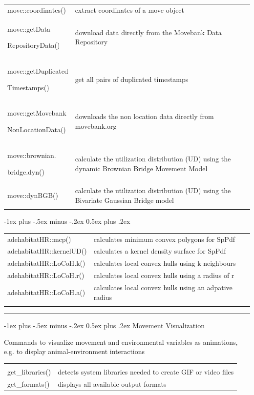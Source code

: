 \documentclass[a4paper,10pt,landscape]{article}
\makeatletter
\renewcommand{\section}{\@startsection{section}{1}{0mm}%
                                {-1ex plus -.5ex minus -.2ex}%
                                {0.5ex plus .2ex}%
                                {\normalfont\large\bfseries}}
\makeatother
\begin{document}
\begin{multicols}{3}
\begin{tabular}{@{}p{\the\MyLen}%
                @{}p{\linewidth-\the\MyLen}@{}}
move::coordinates() & extract coordinates of a move object\\
move::getData\par
RepositoryData() & download data directly from the Movebank Data Repository\\
move::getDuplicated\par
Timestamps() & get all pairs of duplicated timestamps\\
move::getMovebank\par
NonLocationData() & downloads the non location data directly from movebank.org\\
move::brownian.\par
bridge.dyn() & calculate the utilization distribution (UD) using the dynamic Brownian Bridge Movement Model\\
move::dynBGB() &  calculate the utilization distribution (UD) using the Bivariate Gaussian Bridge model\\
& 
\end{tabular}

\section{}
\begin{tabular}{@{}p{\the\MyLen}%
                @{}p{\linewidth-\the\MyLen}@{}}
adehabitatHR::mcp() & calculates minimum convex polygons for SpPdf \\
adehabitatHR::kernelUD() & calculates a kernel density surface for SpPdf \\
adehabitatHR::LoCoH.k() & calculates local convex hulls using k neighbours \\
adehabitatHR::LoCoH.r() & calculates local convex hulls using a radius of r \\
adehabitatHR::LoCoH.a() & calculates local convex hulls using an adpative radius \\
&
\end{tabular}


\rule{0.32\textwidth}{0.4pt}
\section{Movement Visualization}

Commands to visualize movement and environmental variables as animations, e.g. to display animal-environment interactions

\begin{tabular}{@{}p{\the\MyLen}%
                @{}p{\linewidth-\the\MyLen}@{}}
                & \\
get\_libraries() & detects system libraries needed to create GIF or video files \\
get\_formats() & displays all available output formats \\


\end{tabular}
\end{multicols}
\end{document}

